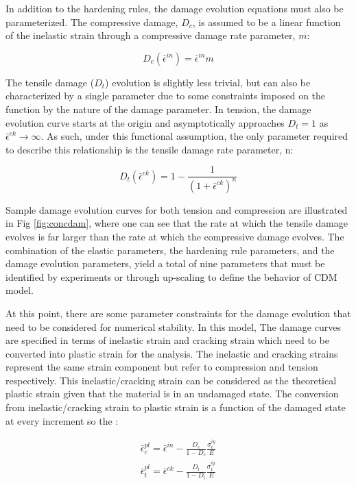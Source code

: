 In addition to the hardening rules, the damage evolution equations must also be parameterized. The compressive damage, $D_c$, is assumed to be a linear function of the inelastic strain through a compressive damage rate parameter, $m$:

\begin{equation}
D_{c}\left(\bar{\epsilon}^{in}\right)=\bar{\epsilon}^{in}m\label{eqn:param3}
\end{equation}


The tensile damage ($D_{t}$) evolution is slightly less trivial,
but can also be characterized by a single parameter due to some constraints
imposed on the function by the nature of the damage parameter. In
tension, the damage evolution curve starts at the origin and asymptotically
approaches $D_{t}=1$ as $\bar{\epsilon}^{ck}\rightarrow\infty$.
As such, under this functional assumption, the only parameter required
to describe this relationship is the tensile damage rate parameter,
n:

\begin{equation}
D_{t}\left(\bar{\epsilon}^{ck}\right)=1-\frac{1}{\left(1+\bar{\epsilon}^{ck}\right)^{n}}\label{eqn:param4}
\end{equation}


Sample damage evolution curves for both tension and compression are
illustrated in Fig \ref{fig:concdam}, where one can see that the rate at which the
tensile damage evolves is far larger than the rate at which the compressive
damage evolves. The combination of the elastic parameters, the hardening
rule parameters, and the damage evolution parameters, yield a total
of nine parameters that must be identified by experiments or through
up-scaling to define the behavior of CDM model.

At this point, there are some parameter constraints for the damage evolution that need to be considered for numerical stability. In this model, The damage curves are specified in terms of inelastic strain and cracking strain which need to be converted into plastic strain for the analysis. The inelastic and cracking strains represent the same strain component but refer to compression and tension respectively. This inelastic/cracking strain can be considered as the theoretical plastic strain given that the material is in an undamaged state. The conversion from inelastic/cracking strain to plastic strain is a function of the damaged state at every increment so the :

\begin{equation}
\label{eqn:param11}
\begin{array}{c}
\bar{\epsilon}_{c}^{pl}=\bar{\epsilon}^{in}-\frac{D_{c}}{1-D_{c}}\frac{\sigma_{c}^{iy}}{E}\\
\bar{\epsilon}_{t}^{pl}=\bar{\epsilon}^{ck}-\frac{D_{t}}{1-D_{t}}\frac{\sigma_{t}^{iy}}{E}
\end{array}
\end{equation}


